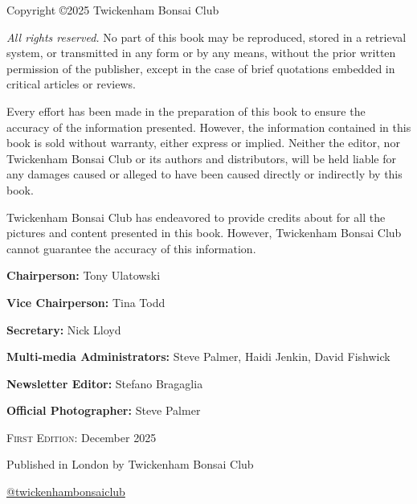 \null
\vfill
\noindent
Copyright \copyright 2025 Twickenham Bonsai Club

\null
\noindent
\textit{All rights reserved.}
No part of this book may be reproduced, stored in a retrieval system, or transmitted in any form or by any means, without the prior written permission of the publisher, except in the case of brief quotations embedded in critical articles or reviews.

Every effort has been made in the preparation of this book to ensure the accuracy of the information presented.
However, the information contained in this book is sold without warranty, either express or implied.
Neither the editor, nor Twickenham Bonsai Club or its authors and distributors, will be held liable for any damages caused or alleged to have been caused directly or indirectly by this book.

Twickenham Bonsai Club has endeavored to provide credits about for all the pictures and content presented in this book.
However, Twickenham Bonsai Club cannot guarantee the accuracy of this information.

\null
\noindent
\textbf{Chairperson:} Tony Ulatowski

\noindent
\textbf{Vice Chairperson:} Tina Todd

\noindent
\textbf{Secretary:} Nick Lloyd

\noindent
\textbf{Multi\--media Administrators:} Steve Palmer, Haidi Jenkin, David Fishwick

\noindent
\textbf{Newsletter Editor:} Stefano Bragaglia

\noindent
\textbf{Official Photographer:} Steve Palmer

\null
\noindent
\textsc{First Edition:} December 2025

\null
\noindent
Published in London by Twickenham Bonsai Club

\null
\begin{center}
    \href{hhttps://www.instagram.com/twickenhambonsaiclub/}{@twickenham\-bonsai\-club}
\end{center}
